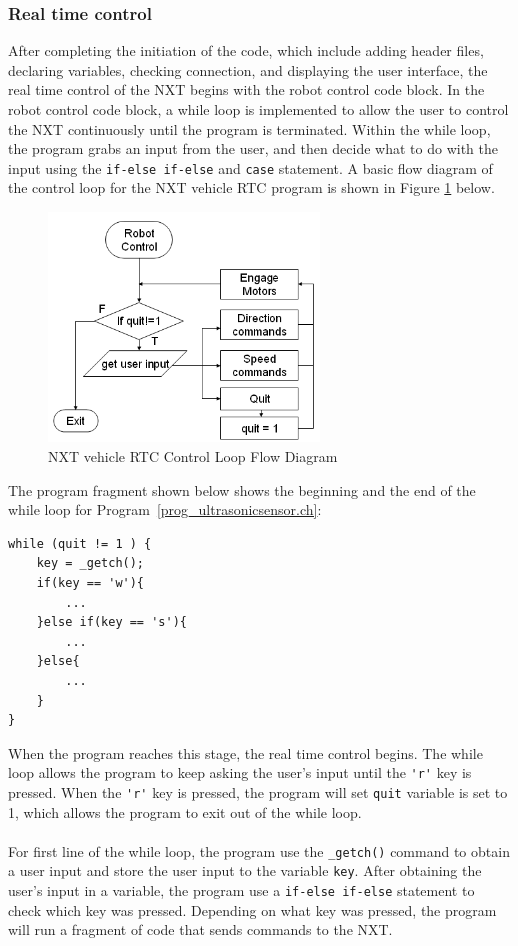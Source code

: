 \documentclass[11pt]{article}
\begin{document}
\subsubsection*{Real time control}
After completing the initiation of the code, which include adding header files, declaring variables,
checking connection, and displaying the user interface, the real time control of the NXT begins with 
the robot control code block. In the robot control code block, a while loop is implemented to allow 
the user to control the NXT continuously until the program is terminated. Within the while loop, the 
program grabs an input from the user, and then decide what to do with the input using the 
\verb+if-else if-else+ and \verb+case+ statement. A basic flow diagram of the control loop for the NXT 
vehicle RTC program is shown in Figure \ref{fig_RTC_controlloop} below.\\
    
\begin{figure}[h]
  \begin{center}
    \includegraphics[height=2.4in]{figure/mindstorm/RTC_controlloop.png}
    \caption{NXT vehicle RTC Control Loop Flow Diagram \label{fig_RTC_controlloop}}
  \end{center}
\end{figure}

\noindent
The program fragment shown below shows the beginning and the end of the while loop for 
Program~\ref{prog_ultrasonicsensor.ch}:

\begin{verbatim}
while (quit != 1 ) {
    key = _getch();
    if(key == 'w'){
        ...
    }else if(key == 's'){
        ...
    }else{
        ...
    }
}
\end{verbatim}

\noindent
When the program reaches this stage, the real time control begins. The while loop allows the program 
to keep asking the user's input until the \verb+'r'+ key is pressed. When the \verb+'r'+ key is 
pressed, the program will set \verb+quit+ variable is set to 1, which allows the program to exit 
out of the while loop.\\ \\
\noindent
For first line of the while loop, the program use the \verb+_getch()+ command to obtain a user
input and store the user input to the variable \verb+key+. After obtaining the user's input in a 
variable, the program use a \verb+if-else if-else+ statement to check which key was pressed. Depending on 
what key was pressed, the program will run a fragment of code that sends commands to the NXT.
\end{document}
